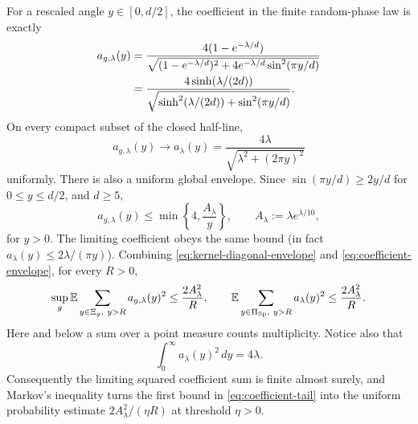 For a rescaled angle \(y\in[0,d/2]\), the coefficient in the finite
random-phase law is exactly
\begin{align}
 a_{g,\lambda}(y)
 &=\frac{4(1-e^{-\lambda/d})}
 {\sqrt{(1-e^{-\lambda/d})^2
       +4e^{-\lambda/d}\sin^2(\pi y/d)}} \notag\\
 &=\frac{4\sinh(\lambda/(2d))}
 {\sqrt{\sinh^2(\lambda/(2d))+\sin^2(\pi y/d)}}.
 \label{eq:finite-critical-coefficient}
\end{align}
On every compact subset of the closed half-line,
\begin{equation}
 a_{g,\lambda}(y)\longrightarrow
 a_\lambda(y)=\frac{4\lambda}
 {\sqrt{\lambda^2+(2\pi y)^2}}
 \label{eq:coefficient-local-limit}
\end{equation}
uniformly.  There is also a uniform global envelope.  Since
\(\sin(\pi y/d)\ge2y/d\) for \(0\le y\le d/2\), and \(d\ge5\),
\begin{equation}
 a_{g,\lambda}(y)\le
 \min\left\{4,\frac{A_\lambda}{y}\right\},
 \qquad A_\lambda:=\lambda e^{\lambda/10},
 \label{eq:coefficient-envelope}
\end{equation}
for \(y>0\).  The limiting coefficient obeys the same bound (in fact
\(a_\lambda(y)\le2\lambda/(\pi y)\)).  Combining
\eqref{eq:kernel-diagonal-envelope} and
\eqref{eq:coefficient-envelope}, for every \(R>0\),
\begin{equation}
 \sup_g\E\sum_{y\in\Xi_g,\ y>R}a_{g,\lambda}(y)^2
 \le \frac{2A_\lambda^2}{R},
 \qquad
 \E\sum_{y\in\PiSp,\ y>R}a_\lambda(y)^2
 \le \frac{2A_\lambda^2}{R}.
 \label{eq:coefficient-tail}
\end{equation}
Here and below a sum over a point measure counts multiplicity.  Notice also
that
\[
 \int_0^\infty a_\lambda(y)^2\,dy=4\lambda.
\]
Consequently the limiting squared coefficient sum is finite almost surely,
and Markov's inequality turns the first bound in
\eqref{eq:coefficient-tail} into the uniform probability estimate
\(2A_\lambda^2/(\eta R)\) at threshold \(\eta>0\).

